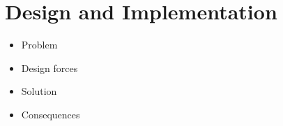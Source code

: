 \section{Design and Implementation\label{design}}

\begin{itemize}
  \item Problem
  \item Design forces
  \item Solution
  \item Consequences
\end{itemize}
